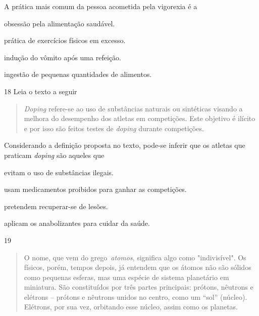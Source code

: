 A prática mais comum da pessoa acometida pela vigorexia é a

\begin{escolha}
\item obsessão pela alimentação saudável.

\item prática de exercícios físicos em excesso.

\item indução do vômito após uma refeição.

\item ingestão de pequenas quantidades de alimentos.
\end{escolha}

\num{18}  Leia o texto a seguir

\begin{quote}
\textit{Doping} refere-se ao uso de substâncias naturais ou sintéticas
visando a melhora do desempenho dos atletas em competições. Este objetivo 
é ilícito e por isso são feitos testes de \textit{doping} durante competições.

\end{quote}

Considerando a definição proposta no texto, pode-se inferir que os atletas
que praticam \textit{doping} são aqueles que

\begin{escolha}
\item evitam o uso de substâncias ilegais.

\item usam medicamentos proibidos para ganhar as competições.

\item pretendem recuperar-se de lesões.

\item aplicam os anabolizantes para cuidar da saúde.
\end{escolha}

\num{19}
\begin{quote}
  O nome, que vem do grego~\emph{atomos}, significa algo como "indivisível". Os
  físicos, porém, tempos depois, já entendem que os átomos não são sólidos como pequenas
  esferas, mas uma espécie de sistema planetário em miniatura. São constituídos por três partes principais: prótons, nêutrons e
  elétrons -- prótons e nêutrons unidos no centro, como um ``sol'' (núcleo). Elétrons, por sua vez, orbitando esse núcleo, assim como os planetas. 

\end{quote}

